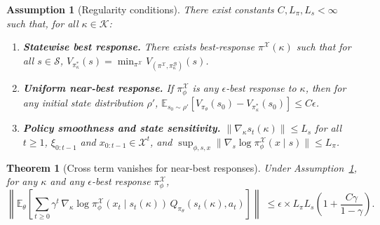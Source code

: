 \documentclass[10pt,a4paper]{amsart}
\newtheorem{assumption}{Assumption}
\newtheorem{theorem}{Theorem}
\begin{document}
\begin{assumption}[Regularity conditions]
\label{ass:regularity-cross-term}
There exist constants $C, L_\pi, L_s < \infty$ such that, for all $\kappa \in \mathcal{K}$:
\begin{enumerate}[leftmargin=*, noitemsep]
    \item \textbf{Statewise best response.} There exists best-response $\pi^{\mathcal{X}}(\kappa)$ such that for all $s \in \mathcal{S}$, $V_{\pi^*_\kappa}(s) = \min_{\pi^{\mathcal{X}}} V_{(\pi^{\mathcal{X}}, \pi^{\mathcal{B}}_\kappa)}(s)$.
    \item \textbf{Uniform near-best response.} If $\pi^{\mathcal{X}}_\phi$ is %
    any $\epsilon$-best response to $\kappa$, then for any initial state distribution $\rho'$, $\mathbb{E}_{s_0 \sim \rho'}[V_{\pi_{\theta}}(s_0) - V_{\pi^*_\kappa}(s_0)] \leq C \epsilon$.
    \item \textbf{Policy smoothness and state sensitivity.} 
    $\|\nabla_\kappa s_t(\kappa)\| \leq L_s$ for all $t\geq 1$, $\xi_{0:t-1}$ and $x_{0:t-1} \in \mathcal X^{t}$, and $\sup_{\phi, s, x} \|\nabla_s \log \pi^{\mathcal{X}}_\phi(x \mid s)\| \leq L_\pi$.
\end{enumerate}
\end{assumption}

\begin{theorem}[Cross term vanishes for near-best responses]
\label{thm:cross-term-vanishes-for-near-opt}
Under Assumption~\ref{ass:regularity-cross-term}, for any $\kappa$ and any $\epsilon$-best response $\pi^{\mathcal{X}}_\phi$,
\[
\left\|
\mathbb{E}_{\theta}\!\left[
\sum_{t\geq 0}
\gamma^{t}\,
\nabla_{\kappa}\log \pi^{\mathcal{X}}_{\phi}\!\left(x_t \mid s_t(\kappa)\right)\,
Q_{\pi_{\theta}}(s_t(\kappa),a_t)
\right]
\right\|
\;\leq \epsilon  \times  L_{\pi} L_s  \left(1 + \frac{C \gamma}{1 - \gamma} \right).
\]
\end{theorem}
\end{document}
